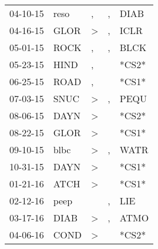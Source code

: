 \begin{supertabular}{p{0.07\textwidth}p{0.06\textwidth}p{0.02\textwidth}p{0.02\textwidth}p{0.06\textwidth}}
          04-10-15\textsuperscript{} &           reso\textsuperscript{} &                , &                , &           DIAB\textsuperscript{} \\
          04-16-15\textsuperscript{} &           GLOR\textsuperscript{} &     \textgreater &                , &           ICLR\textsuperscript{} \\
          05-01-15\textsuperscript{} &           ROCK\textsuperscript{} &                , &                , &           BLCK\textsuperscript{} \\
          05-23-15\textsuperscript{} &           HIND\textsuperscript{} &                , &                  &                            *CS2* \\
          06-25-15\textsuperscript{} &           ROAD\textsuperscript{} &                , &                  &                            *CS1* \\
          07-03-15\textsuperscript{} &           SNUC\textsuperscript{} &     \textgreater &                , &           PEQU\textsuperscript{} \\
          08-06-15\textsuperscript{} &           DAYN\textsuperscript{} &     \textgreater &                  &                            *CS2* \\
          08-22-15\textsuperscript{} &           GLOR\textsuperscript{} &     \textgreater &                  &                            *CS1* \\
          09-10-15\textsuperscript{} &           blbc\textsuperscript{} &     \textgreater &                , &           WATR\textsuperscript{} \\
          10-31-15\textsuperscript{} &           DAYN\textsuperscript{} &     \textgreater &                  &                            *CS1* \\
          01-21-16\textsuperscript{} &           ATCH\textsuperscript{} &     \textgreater &                  &                            *CS1* \\
          02-12-16\textsuperscript{} &           peep\textsuperscript{} &                  &                , &            LIE\textsuperscript{} \\
          03-17-16\textsuperscript{} &           DIAB\textsuperscript{} &     \textgreater &                , &           ATMO\textsuperscript{} \\
          04-06-16\textsuperscript{} &           COND\textsuperscript{} &     \textgreater &                  &                            *CS2* \\

\end{supertabular}
